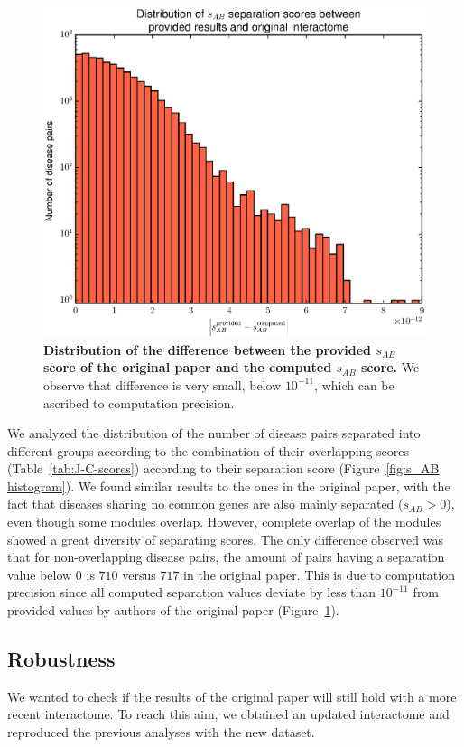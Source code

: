 \documentclass[letterpaper]{article}
\begin{document}
		\begin{figure}[!h]
		\hspace{-.55cm}
		\includegraphics[width=.55\textwidth]{images/sep_difference_histogram.eps}
		\vspace{-.5cm}
		\caption{{\bf Distribution of the difference between the provided $s_{AB}$ score of the original
		paper and the computed $s_{AB}$ score.} We observe that difference is very small, below $10^{-11}$, which can be ascribed
		to computation precision.
		\label{fig:s_AB difference}}
		\vspace{-1cm}
		\end{figure}

		We analyzed the distribution of the number of disease pairs separated into different groups according
		to the combination of their overlapping scores (Table~\ref{tab:J-C-scores}) according to their
		separation score (Figure~\ref{fig:s_AB histogram}). We found similar results to the ones in the
		original paper, with the fact that diseases sharing no common genes are also mainly separated
		($s_{AB} > 0$), even though some modules overlap. However, complete overlap of the modules showed a
		great diversity of separating scores. The only difference observed was that for non-overlapping
		disease pairs, the amount of pairs having a separation value below 0 is $710$ versus $717$ in the
		original paper. This is due to computation precision since all computed separation values deviate
		by less than $10^{-11}$ from provided values by authors of the original paper
		(Figure~\ref{fig:s_AB difference}).

	\subsection{Robustness}
	We wanted to check if the results of the original paper will still hold with a more recent interactome.
	To reach this aim, we obtained an updated interactome and reproduced the previous analyses with the
	new dataset.
\end{document}

